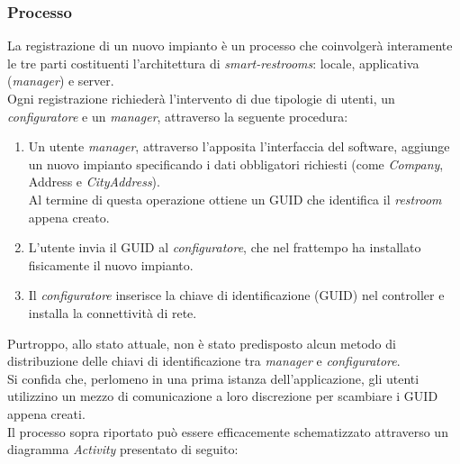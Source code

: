 \documentclass[12pt]{article}
\begin{document}
\subsubsection{Processo} 
La registrazione di un nuovo impianto è un processo che coinvolgerà interamente le tre parti costituenti l'architettura di \textit{smart-restrooms}: locale, applicativa (\textit{manager}) e server.\\
Ogni registrazione richiederà l'intervento di due tipologie di utenti, un \textit{configuratore} e un \textit{manager}, attraverso la seguente procedura:
\begin{enumerate}
\item Un utente \textit{manager}, attraverso l'apposita l'interfaccia del software, aggiunge un nuovo impianto specificando i dati obbligatori richiesti (come \textit{Company}, Address e \textit{CityAddress}).\\
Al termine di questa operazione ottiene un GUID che identifica il \textit{restroom} appena creato.
\item L'utente invia il GUID al \textit{configuratore}, che nel frattempo ha installato fisicamente il nuovo impianto.
\item Il \textit{configuratore} inserisce la chiave di identificazione (GUID) nel controller e installa la connettività di rete.
\end{enumerate}
Purtroppo, allo stato attuale, non è stato predisposto alcun metodo di distribuzione delle chiavi di identificazione tra \textit{manager} e \textit{configuratore}.\\
Si confida che, perlomeno in una prima istanza dell'applicazione, gli utenti utilizzino un mezzo di comunicazione a loro discrezione per scambiare i GUID appena creati.\\
Il processo sopra riportato può essere efficacemente schematizzato attraverso un diagramma \textit{Activity} presentato di seguito:
\end{document}
